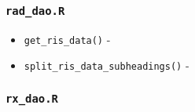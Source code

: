 \documentclass[
]{book}
\providecommand{\tightlist}{%
  \setlength{\itemsep}{0pt}\setlength{\parskip}{0pt}}
\begin{document}
\hypertarget{rad_dao.r}{%
\subsubsection{\texorpdfstring{\texttt{rad\_dao.R}}{rad\_dao.R}}\label{rad_dao.r}}

\begin{itemize}
\tightlist
\item
  \texttt{get\_ris\_data()} -
\item
  \texttt{split\_ris\_data\_subheadings()} -
\end{itemize}

\hypertarget{rx_dao.r}{%
\subsubsection{\texorpdfstring{\texttt{rx\_dao.R}}{rx\_dao.R}}\label{rx_dao.r}}
\end{document}

